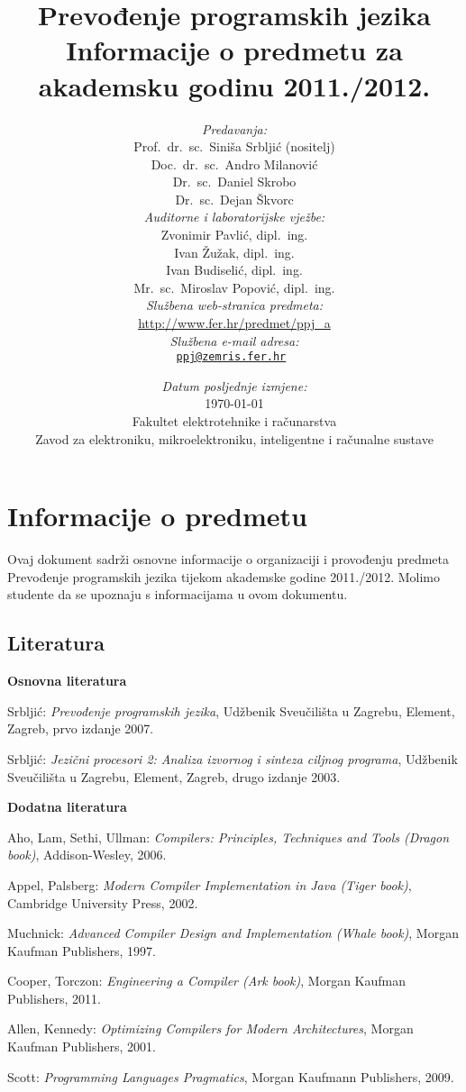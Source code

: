 \documentclass[times, 12pt, utf8]{book}
\title{
\vfill
\textbf{Prevođenje programskih jezika}\\
\vspace{30pt}
Informacije o predmetu za akademsku godinu 2011./2012. \\
\vspace{40pt}
}
\author{
\emph{Predavanja:} \\
Prof.~dr.~sc.~Siniša Srbljić (nositelj) \\
Doc.~dr.~sc.~Andro Milanović \\
Dr.~sc.~Daniel Skrobo \\
\vspace{30pt}
Dr.~sc.~Dejan Škvorc \\
\emph{Auditorne i laboratorijske vježbe:} \\
Zvonimir Pavlić, dipl.~ing. \\
Ivan Žužak, dipl.~ing. \\
Ivan Budiselić, dipl.~ing. \\
\vspace{30pt}
Mr.~sc.~Miroslav Popović, dipl.~ing. \\
\emph{Službena web-stranica predmeta:} \\
\vspace{30pt}
\url{http://www.fer.hr/predmet/ppj_a} \\
\emph{Službena e-mail adresa:} \\
\tt{\href{mailto:ppj@zemris.fer.hr}{ppj@zemris.fer.hr}}
}
\date{
\vspace{30pt} 
\emph{Datum posljednje izmjene:} \\
\today \\
\vfill
Fakultet elektrotehnike i računarstva \\
Zavod za elektroniku, mikroelektroniku, inteligentne i računalne sustave
}
\begin{document}
\maketitle

\section*{Informacije o predmetu}

Ovaj dokument sadrži osnovne informacije o organizaciji i provođenju predmeta Prevođenje programskih jezika tijekom akademske godine 2011./2012. 
Molimo studente da se upoznaju s informacijama u ovom dokumentu.

\let\cleardoublepage\relax
{}

\tableofcontents

\cleardoublepage  
{}  
{}  
\subsection*{Literatura}

\textbf{Osnovna literatura}

Srbljić: \textit{Prevođenje programskih jezika}, Udžbenik Sveučilišta u Zagrebu, Element, Zagreb, prvo izdanje 2007.

Srbljić: \textit{Jezični procesori 2: Analiza izvornog i sinteza ciljnog programa}, Udžbenik Sveučilišta u Zagrebu, Element, Zagreb, drugo izdanje 2003.

\textbf{Dodatna literatura}

Aho, Lam, Sethi, Ullman: \textit{Compilers: Principles, Techniques and Tools (Dragon book)}, Addison-Wesley, 2006. 

Appel, Palsberg: \textit{Modern Compiler Implementation in Java (Tiger book)}, Cambridge University Press, 2002.

Muchnick: \textit{Advanced Compiler Design and Implementation (Whale book)}, Morgan Kaufman Publishers, 1997.

Cooper, Torczon: \textit{Engineering a Compiler (Ark book)}, Morgan Kaufman Publishers, 2011.

Allen, Kennedy: \textit{Optimizing Compilers for Modern Architectures}, Morgan Kaufman Publishers, 2001.

Scott: \textit{Programming Languages Pragmatics}, Morgan Kaufmann Publishers, 2009.

\cleardoublepage  
{}
{}
\end{document}
